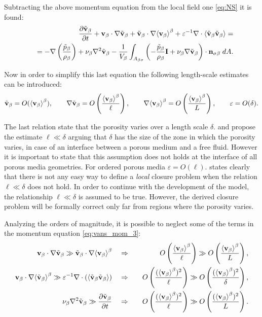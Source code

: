 \noindent Subtracting the above momentum equation from the local field one \eqref{eq:NS} it is found:
\begin{eqnarray}
&&  \dfrac{\partial \tilde{\textbf{v}}_{\beta}}{\partial t} + \textbf{v}_{\beta} \cdot \nabla \tilde{\textbf{v}}_{\beta} + \tilde{\textbf{v}}_{\beta} \cdot \nabla {\left< \textbf{v}_{\beta}\right>}^{\beta} + \varepsilon^{-1}\nabla \cdot  {\left< \tilde{\textbf{v}}_{\beta}\tilde{\textbf{v}}_{\beta}\right>} = \nonumber \\
&&= -\nabla \left(\dfrac{\tilde{p}_{\beta}}{\rho_{\beta}}\right) + \nu_{\beta} \nabla^2 \tilde{\textbf{v}}_{\beta}  - \dfrac{1}{V_\beta} \displaystyle\int_{A_{\beta \sigma}} \left(-\dfrac{\tilde{p}_{\beta}}{\rho_{\beta}} \mathbf{I}  + \nu_{\beta} \nabla \tilde{\textbf{v}}_{\beta} \right) \cdot \mathbf{n}_{\sigma \beta} \;dA.
\label{eq:vans_mom_3}
\end{eqnarray}

Now in order to simplify this last equation the following length-scale estimates can be introduced:
$$ \tilde{\textbf{v}}_{\beta} = O({\left< \textbf{v}_{\beta} \right>}^{\beta}), \qquad \nabla\tilde{\textbf{v}}_{\beta} = O \left(\dfrac{{\left< \textbf{v}_{\beta} \right>}^{\beta}}{\ell} \right), \qquad  \nabla {\left< \textbf{v}_{\beta}\right>}^{\beta} = O\left(\dfrac{{\left< \textbf{v}_{\beta} \right>}^{\beta}}{L}\right), \qquad \varepsilon = O(\delta). $$

The last relation state that the porosity varies over a length scale $\delta$. \citet{valdes2013velocity} and \citet{ochoa1995momentum} propose the estimate $\ell \ll \delta$ arguing that $\delta$ has the size of the zone in which the porosity varies, in case of an interface between a porous medium and a free fluid.
However it is important to state that this assumption does not holds at the interface of all porous media geometries. For ordered porous media $\varepsilon = O(\ell)$.
\citet{whitaker1996forchheimer} states clearly that there is not any easy way to define a \textit{local} closure problem when the relation $\ell \ll \delta$ does not hold.
In order to continue with the development of the model, the relationship $\ell \ll \delta$ is assumed to be true. However, the derived closure problem will be formally correct only far from regions where the porosity varies.

Analyzing the orders of magnitude, it is possible to neglect some of the terms in the momentum equation \eqref{eq:vans_mom_3}:
\begin{eqnarray}
\textbf{v}_{\beta} \cdot \nabla \tilde{\textbf{v}}_{\beta} \gg \tilde{\textbf{v}}_{\beta} \cdot \nabla {\left< \textbf{v}_{\beta}\right>}^{\beta} \quad &\Rightarrow&  \quad O\left(\dfrac{{\left< \textbf{v}_{\beta} \right>}^{\beta}}{\ell}\right) \gg O\left(\dfrac{{\left< \textbf{v}_{\beta} \right>}^{\beta}}{L} \right), \\
\textbf{v}_{\beta} \cdot \nabla {\left< \tilde{\textbf{v}}_{\beta}\right>}^{\beta} \gg  \varepsilon^{-1} \nabla \cdot \left({\left< \tilde{\textbf{v}}_{\beta} \tilde{\textbf{v}}_{\beta} \right>}\right)  \quad &\Rightarrow& \quad O\left(\dfrac{({\left< \textbf{v}_{\beta} \right>}^{\beta})^2}{\ell}\right) \gg O\left(\dfrac{({\left< \textbf{v}_{\beta} \right>}^{\beta})^2}{\delta} \right), \label{eq:sbs}\\
\nu_{\beta} \nabla^2 \tilde{\textbf{v}}_{\beta} \gg  \dfrac{\partial \tilde{\textbf{v}}_{\beta}}{\partial t}  \quad &\Rightarrow&  \quad O\left(\dfrac{({\left< \textbf{v}_{\beta} \right>}^{\beta})^2}{\ell}\right) \gg O\left(\dfrac{({\left< \textbf{v}_{\beta} \right>}^{\beta})^2}{L} \right).
\end{eqnarray}

